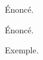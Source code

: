 \begin{mytheorem}
  Énoncé.
\end{mytheorem} %

\begin{definition*}
  Énoncé.
\end{definition*} %

\begin{example}
  Exemple.
\end{example}
